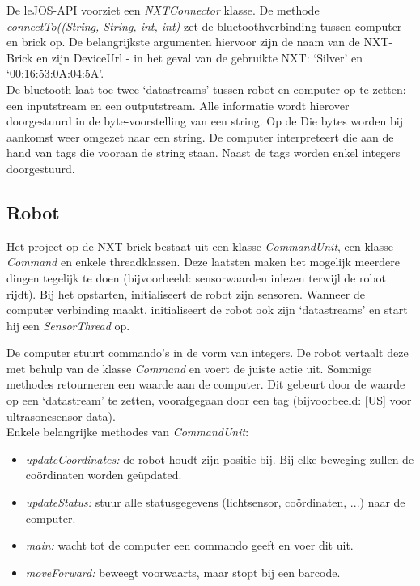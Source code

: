 \documentclass[tt3]{penoverslag}
\begin{document}
De leJOS-API \cite{leJOS} voorziet een \textit{NXTConnector} klasse. De methode \textit{connectTo((String, String, int, int)} zet de bluetoothverbinding tussen computer en brick op. De belangrijkste argumenten hiervoor zijn de naam van de NXT-Brick en zijn DeviceUrl  - in het geval van de gebruikte NXT: `Silver' en `00:16:53:0A:04:5A'.\\

De bluetooth laat toe twee `datastreams' tussen robot en computer op te zetten: een inputstream en een outputstream. Alle informatie wordt hierover doorgestuurd in de byte-voorstelling van een string. Op de Die bytes worden bij aankomst weer omgezet naar een string. De computer interpreteert die aan de hand van tags die vooraan de string staan. Naast de tags worden enkel integers doorgestuurd.

\subsection{Robot} %
\label{ssec:robot}
Het project op de NXT-brick bestaat uit een klasse \textit{CommandUnit}, een klasse \textit{Command} en enkele threadklassen. Deze laatsten maken het mogelijk meerdere dingen tegelijk te doen (bijvoorbeeld: sensorwaarden inlezen terwijl de robot rijdt). Bij het opstarten, initialiseert de robot zijn sensoren. Wanneer de computer verbinding maakt, initialiseert de robot ook zijn `datastreams' en start hij een \textit{SensorThread} op.

De computer stuurt commando's in de vorm van integers. De robot vertaalt deze met behulp van de klasse \textit{Command} en voert de juiste actie uit. Sommige methodes retourneren een waarde aan de computer. Dit gebeurt door de waarde op een `datastream' te zetten, voorafgegaan door een tag (bijvoorbeeld: [US] voor ultrasonesensor data).\\

Enkele belangrijke methodes van \textit{CommandUnit}:
\begin{itemize}
\item \textit{updateCoordinates:} de robot houdt zijn positie bij. Bij elke beweging zullen de co\"ordinaten worden ge\"updated.
\item \textit{updateStatus:} stuur alle statusgegevens (lichtsensor, co\"ordinaten, ...) naar de computer.
\item \textit{main:} wacht tot de computer een commando geeft en voer dit uit.
\item \textit{moveForward:} beweegt voorwaarts, maar stopt bij een barcode.
\end{itemize}
\end{document}
